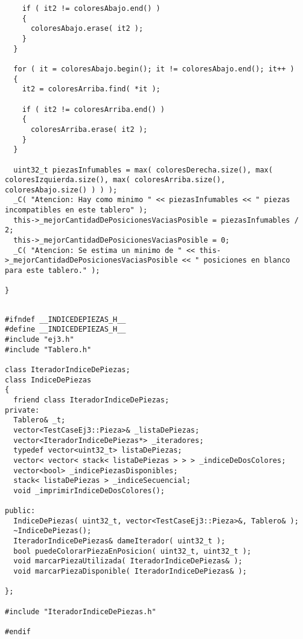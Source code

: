\documentclass[11pt, a4paper, twoside]{article}
\begin{document}
\begin{lstlisting}
    if ( it2 != coloresAbajo.end() )
    {
      coloresAbajo.erase( it2 );
    }
  }

  for ( it = coloresAbajo.begin(); it != coloresAbajo.end(); it++ )
  {
    it2 = coloresArriba.find( *it );

    if ( it2 != coloresArriba.end() )
    {
      coloresArriba.erase( it2 );
    }
  }

  uint32_t piezasInfumables = max( coloresDerecha.size(), max( coloresIzquierda.size(), max( coloresArriba.size(), coloresAbajo.size() ) ) );
  _C( "Atencion: Hay como minimo " << piezasInfumables << " piezas incompatibles en este tablero" );
  this->_mejorCantidadDePosicionesVaciasPosible = piezasInfumables / 2;
  this->_mejorCantidadDePosicionesVaciasPosible = 0;
  _C( "Atencion: Se estima un minimo de " << this->_mejorCantidadDePosicionesVaciasPosible << " posiciones en blanco para este tablero." );

}

\end{lstlisting}
\clearpage


\begin{lstlisting}

#ifndef __INDICEDEPIEZAS_H__
#define __INDICEDEPIEZAS_H__
#include "ej3.h"
#include "Tablero.h"

class IteradorIndiceDePiezas;
class IndiceDePiezas
{
  friend class IteradorIndiceDePiezas;
private:
  Tablero& _t;
  vector<TestCaseEj3::Pieza>& _listaDePiezas;
  vector<IteradorIndiceDePiezas*> _iteradores;
  typedef vector<uint32_t> listaDePiezas;
  vector< vector< stack< listaDePiezas > > > _indiceDeDosColores;
  vector<bool> _indicePiezasDisponibles;
  stack< listaDePiezas > _indiceSecuencial;
  void _imprimirIndiceDeDosColores();

public:
  IndiceDePiezas( uint32_t, vector<TestCaseEj3::Pieza>&, Tablero& );
  ~IndiceDePiezas();
  IteradorIndiceDePiezas& dameIterador( uint32_t );
  bool puedeColorarPiezaEnPosicion( uint32_t, uint32_t );
  void marcarPiezaUtilizada( IteradorIndiceDePiezas& );
  void marcarPiezaDisponible( IteradorIndiceDePiezas& );

};

#include "IteradorIndiceDePiezas.h"

#endif

\end{lstlisting}
\clearpage
\end{document}
